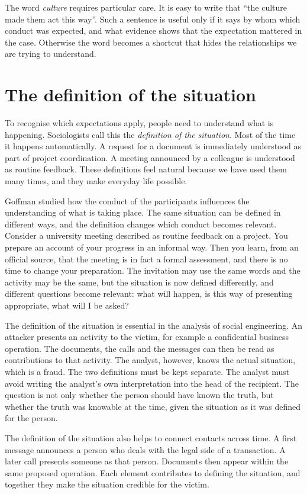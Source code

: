 The word \emph{culture} requires particular care. It is easy to write that ``the culture made them act this way''. Such a sentence is useful only if it says by whom which conduct was expected, and what evidence shows that the expectation mattered in the case. Otherwise the word becomes a shortcut that hides the relationships we are trying to understand.

\section{The definition of the situation}

To recognise which expectations apply, people need to understand what is happening. Sociologists call this the \emph{definition of the situation}. Most of the time it happens automatically. A request for a document is immediately understood as part of project coordination. A meeting announced by a colleague is understood as routine feedback. These definitions feel natural because we have used them many times, and they make everyday life possible.

Goffman studied how the conduct of the participants influences the understanding of what is taking place. The same situation can be defined in different ways, and the definition changes which conduct becomes relevant. Consider a university meeting described as routine feedback on a project. You prepare an account of your progress in an informal way. Then you learn, from an official source, that the meeting is in fact a formal assessment, and there is no time to change your preparation. The invitation may use the same words and the activity may be the same, but the situation is now defined differently, and different questions become relevant: what will happen, is this way of presenting appropriate, what will I be asked?

The definition of the situation is essential in the analysis of social engineering. An attacker presents an activity to the victim, for example a confidential business operation. The documents, the calls and the messages can then be read as contributions to that activity. The analyst, however, knows the actual situation, which is a fraud. The two definitions must be kept separate. The analyst must avoid writing the analyst's own interpretation into the head of the recipient. The question is not only whether the person should have known the truth, but whether the truth was knowable at the time, given the situation as it was defined for the person.

The definition of the situation also helps to connect contacts across time. A first message announces a person who deals with the legal side of a transaction. A later call presents someone as that person. Documents then appear within the same proposed operation. Each element contributes to defining the situation, and together they make the situation credible for the victim.

